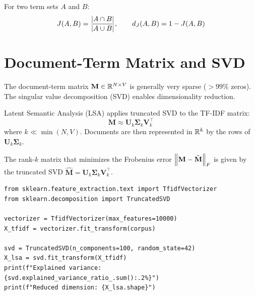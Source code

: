 \begin{definition}
For two term sets $A$ and $B$:
\[
J(A, B) = \frac{\left| A \cap B \right|}{\left| A \cup B \right|}, \qquad d_J(A, B) = 1 - J(A, B)
\]
\end{definition}

\section{Document-Term Matrix and SVD}
\label{sec:rep:svd}

The document-term matrix $\mathbf{M} \in \mathbb{R}^{N \times V}$ is generally very
sparse ($> 99\%$ zeros). The singular value decomposition (SVD) enables
dimensionality reduction.

\begin{definition}
Latent Semantic Analysis (LSA) applies truncated SVD to the TF-IDF matrix:
\[
\mathbf{M} \approx \mathbf{U}_k \boldsymbol{\Sigma}_k \mathbf{V}_k^\top
\]
where $k \ll \min(N, V)$. Documents are then represented in $\mathbb{R}^k$ by the rows
of $\mathbf{U}_k \boldsymbol{\Sigma}_k$.
\end{definition}

\begin{theorem}
The rank-$k$ matrix that minimizes the Frobenius error
$\left\| \mathbf{M} - \hat{\mathbf{M}} \right\|_F$ is given by the truncated SVD
$\hat{\mathbf{M}} = \mathbf{U}_k \boldsymbol{\Sigma}_k \mathbf{V}_k^\top$.
\end{theorem}

\begin{codeblock}[title=\textbf{LSA with scikit-learn}]
\begin{verbatim}
from sklearn.feature_extraction.text import TfidfVectorizer
from sklearn.decomposition import TruncatedSVD

vectorizer = TfidfVectorizer(max_features=10000)
X_tfidf = vectorizer.fit_transform(corpus)

svd = TruncatedSVD(n_components=100, random_state=42)
X_lsa = svd.fit_transform(X_tfidf)
print(f"Explained variance: {svd.explained_variance_ratio_.sum():.2%}")
print(f"Reduced dimension: {X_lsa.shape}")
\end{verbatim}
\end{codeblock}


